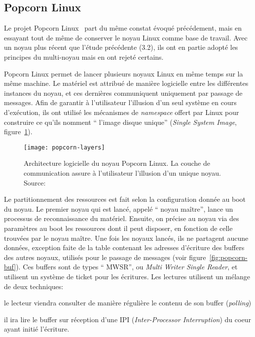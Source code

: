       
    \subsection{Popcorn Linux}

      Le projet Popcorn Linux~\citep{barbalacepopcorn} part du même constat
      évoqué précédement, mais en essayant tout de même de conserver le noyau
      Linux comme base de travail. Avec un noyau plus récent que l'étude
      précédente (3.2), ils ont en partie adopté les principes du multi-noyau
      mais en ont rejeté certains.

      Popcorn Linux permet de lancer plusieurs noyaux Linux en même temps sur la
      même machine. Le matériel est attribué de manière logicielle entre les
      différentes instances du noyau, et ces dernières communiquent uniquement
      par passage de messages. Afin de garantir à l’utilisateur l’illusion d’un
      seul système en cours d'exécution, ils ont utilisé les mécanismes de
      \textit{namespace} offert par Linux pour construire ce qu’ils nomment ``
      l’image disque unique'' (\textit{Single System Image},
      figure~\ref{fig:popcorn-layers}).

      \begin{figure}[h]
        \centering
        \texttt{[image: popcorn-layers]}
        \caption{Architecture logicielle du noyau Popcorn Linux. La couche de
          communication assure à l'utilisateur l'illusion d'un unique noyau.
          Source:~\citeauthor{barbalacepopcorn}}
        \label{fig:popcorn-layers}
      \end{figure}

      Le partitionnement des ressources est fait selon la configuration donnée
      au boot du noyau. Le premier noyau qui est lancé, appelé `` noyau
      maître'', lance un processus de reconnaissance du matériel. Ensuite, on
      précise au noyau via des paramètres au boot les ressources dont il peut
      disposer, en fonction de celle trouvées par le noyau maître. Une fois les
      noyaux lancés, ils ne partagent aucune données, exception faite de la
      table contenant les adresses d’écriture des buffers des autres noyaux,
      utilisés pour le passage de messages (voir
      figure~\ref{fig:popcorn-buf}). Ces buffers sont de types `` MWSR'', ou
      \textit{Multi Writer Single Reader}, et utilisent un système de ticket
      pour les écritures. Les lectures utilisent un mélange de deux
      techniques:\benumline \item le lecteur viendra consulter de manière
      régulière le contenu de son buffer (\textit{polling}) \item il ira lire le
      buffer sur réception d’une IPI (\textit{Inter-Processor Interruption}) du
      coeur ayant initié l’écriture\eenumline.


